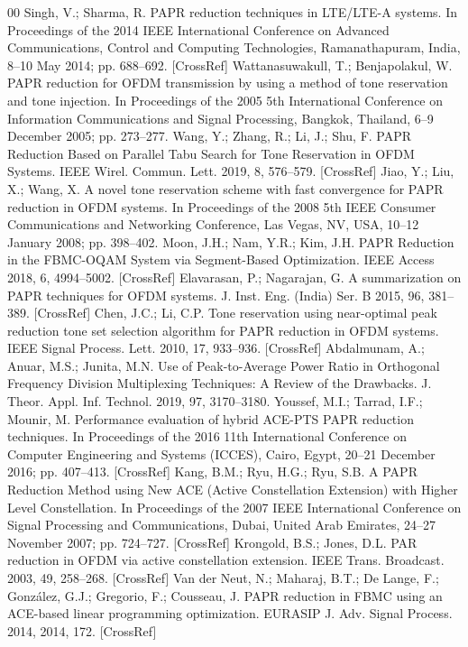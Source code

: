 \documentclass[conference]{IEEEtran}
\begin{document}
\begin{thebibliography}{00}
 Singh, V.; Sharma, R. PAPR reduction techniques in LTE/LTE-A systems. In Proceedings of the 2014 IEEE International Conference on Advanced Communications, Control and Computing Technologies, Ramanathapuram, India, 8–10 May 2014; pp. 688–692. [CrossRef]
 Wattanasuwakull, T.; Benjapolakul, W. PAPR reduction for OFDM transmission by using a method of tone reservation and tone injection. In Proceedings of the 2005 5th International Conference on Information Communications and Signal Processing, Bangkok, Thailand, 6–9 December 2005; pp. 273–277.
 Wang, Y.; Zhang, R.; Li, J.; Shu, F. PAPR Reduction Based on Parallel Tabu Search for Tone Reservation in OFDM Systems. IEEE Wirel. Commun. Lett. 2019, 8, 576–579. [CrossRef]
 Jiao, Y.; Liu, X.; Wang, X. A novel tone reservation scheme with fast convergence for PAPR reduction in OFDM systems. In Proceedings of the 2008 5th IEEE Consumer Communications and Networking Conference, Las Vegas, NV, USA, 10–12 January 2008; pp. 398–402.
 Moon, J.H.; Nam, Y.R.; Kim, J.H. PAPR Reduction in the FBMC-OQAM System via Segment-Based Optimization. IEEE Access 2018, 6, 4994–5002. [CrossRef]
 Elavarasan, P.; Nagarajan, G. A summarization on PAPR techniques for OFDM systems. J. Inst. Eng. (India) Ser. B 2015, 96, 381–389. [CrossRef]
 Chen, J.C.; Li, C.P. Tone reservation using near-optimal peak reduction tone set selection algorithm for PAPR reduction in OFDM systems. IEEE Signal Process. Lett. 2010, 17, 933–936. [CrossRef]
 Abdalmunam, A.; Anuar, M.S.; Junita, M.N. Use of Peak-to-Average Power Ratio in Orthogonal Frequency Division Multiplexing Techniques: A Review of the Drawbacks. J. Theor. Appl. Inf. Technol. 2019, 97, 3170–3180.
 Youssef, M.I.; Tarrad, I.F.; Mounir, M. Performance evaluation of hybrid ACE-PTS PAPR reduction techniques. In Proceedings of the 2016 11th International Conference on Computer Engineering and Systems (ICCES), Cairo, Egypt, 20–21 December 2016; pp. 407–413. [CrossRef]
 Kang, B.M.; Ryu, H.G.; Ryu, S.B. A PAPR Reduction Method using New ACE (Active Constellation Extension) with Higher Level Constellation. In Proceedings of the 2007 IEEE International Conference on Signal Processing and Communications, Dubai, United Arab Emirates, 24–27 November 2007; pp. 724–727. [CrossRef]
 Krongold, B.S.; Jones, D.L. PAR reduction in OFDM via active constellation extension. IEEE Trans. Broadcast. 2003, 49, 258–268. [CrossRef]
 Van der Neut, N.; Maharaj, B.T.; De Lange, F.; González, G.J.; Gregorio, F.; Cousseau, J. PAPR reduction in FBMC using an ACE-based linear programming optimization. EURASIP J. Adv. Signal Process. 2014, 2014, 172. [CrossRef]

\end{thebibliography}
\end{document}
